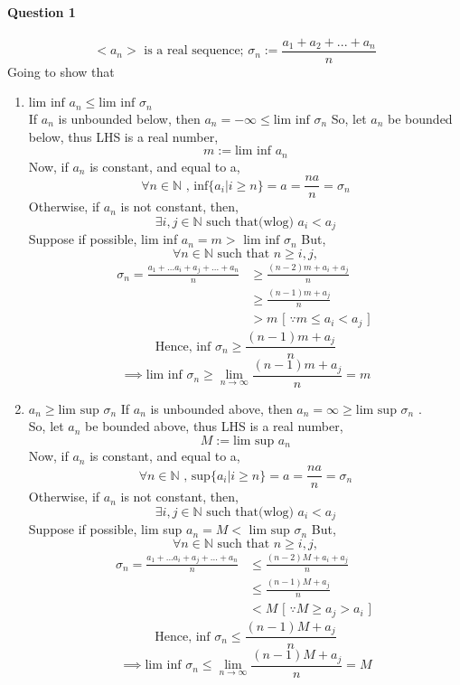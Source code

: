 \documentclass[20pt]{extarticle} %
\begin{document}
\paragraph{Question 1}
\[ <a_n>\text{ is a real sequence; }\sigma_n := \frac{a_1+a_2+...+a_n}{n} \]
Going to show that
\begin{enumerate}[label=\Roman*]
	\item $\text{lim inf } a_n \leq \text{lim inf }\sigma_n  $ \\
		If $a_n$ is unbounded below, then $a_n = -\infty \leq \text{lim inf }\sigma_n$
		So, let $a_n$ be bounded below, thus LHS is a real number,
		\[ m:= \text{lim inf }a_n \]
		Now, if $a_n$ is constant, and equal to a,
		\[ \forall n \in \mathbb{N} \text{ , inf} \{ a_i | i\geq n \} =a = \frac{na}{n} =\sigma_n\]
		Otherwise, if $a_n$ is not constant, then,
		\[ \exists i,j \in \mathbb{N} \text { such that(wlog) } a_i < a_j \]
		Suppose if possible, lim inf $a_n=m> \text{ lim inf } \sigma_n$
		But, \[ \forall n \in \mathbb{N} \text{ such that } n \geq i,j, \]
		\begin{equation*}
			\begin{split}
				\sigma_n= \frac{a_1 + ... a_i + a_j + ... + a_n}{n} & \geq{\frac{(n-2)m+a_i+a_j}{n}}\\
										    & \geq \frac{(n-1)m+a_j}{n}\\
										    & >m \text{ [ $\because m \leq a_i < a_j $ ] }
			\end{split}
		\end{equation*}
		\[	\text{Hence, inf } \sigma_n \geq \frac{(n-1)m+a_j}{n} \]
		\[		\implies \text{lim inf } \sigma_n \geq \lim_{n \to \infty} \frac{(n-1)m+a_j}{n}=m\]

	\item {}$ a_n \geq \text{lim sup }\sigma_n$
		If $a_n$ is unbounded above, then $a_n =  \infty \geq \text{lim sup }\sigma_n$ .\\

		So, let $a_n$ be bounded above, thus LHS is a real number,
		\[ M:= \text{lim sup }a_n \]
		Now, if $a_n$ is constant, and equal to a,
		\[ \forall n \in \mathbb{N} \text{ , sup} \{ a_i | i\geq n \} =a = \frac{na}{n} =\sigma_n\]
		Otherwise, if $a_n$ is not constant, then,
		\[ \exists i,j \in \mathbb{N} \text { such that(wlog) } a_i < a_j \]
		Suppose if possible, lim sup $a_n=M< \text{ lim sup } \sigma_n$
		But, \[ \forall n \in \mathbb{N} \text{ such that } n \geq i,j, \]
		\begin{equation*}
			\begin{split}
				\sigma_n= \frac{a_1 + ... a_i + a_j + ... + a_n}{n} & \leq{\frac{(n-2)M+a_i+a_j}{n}}\\
										    & \leq \frac{(n-1)M+a_j}{n}\\
										    & <M \text{ [ $\because M \geq a_j > a_i $ ] }
			\end{split}
		\end{equation*}
		\[	\text{Hence, inf } \sigma_n \leq \frac{(n-1)M+a_j}{n} \]
		\[		\implies \text{lim inf } \sigma_n \leq \lim_{n \to \infty} \frac{(n-1)M+a_j}{n}=M\]
\end{enumerate}
\end{document}
